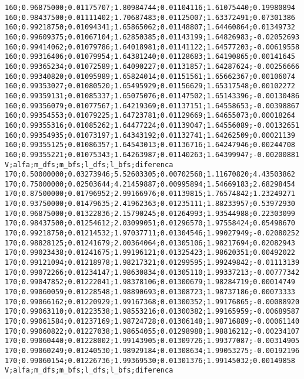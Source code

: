 \documentclass[brazil,times]{abnt}
\begin{document}
{\begin{verbatim}
160;0.96875000;0.01175707;1.80984744;0.01104116;1.61075440;0.19980894
160;0.98437500;0.01111402;1.70687483;0.01125007;1.63372491;0.07301386
160;0.99218750;0.01094341;1.65865062;0.01148807;1.64460864;0.01349732
160;0.99609375;0.01067104;1.62850385;0.01143199;1.64826983;-0.02052693
160;0.99414062;0.01079786;1.64018981;0.01141122;1.64577203;-0.00619558
160;0.99316406;0.01079954;1.64381240;0.01128683;1.64190865;0.00141645
160;0.99365234;0.01072589;1.64090227;0.01131857;1.64287624;-0.00256666
160;0.99340820;0.01095989;1.65824014;0.01151561;1.65662367;0.00106074
160;0.99353027;0.01080520;1.65495929;0.01156629;1.65317548;0.00102272
160;0.99359131;0.01085337;1.65075076;0.01147502;1.65143396;-0.00130486
160;0.99356079;0.01077567;1.64219369;0.01137151;1.64558653;-0.00398867
160;0.99354553;0.01079225;1.64723781;0.01129669;1.64655073;0.00018264
160;0.99355316;0.01085262;1.64477224;0.01139047;1.64556089;-0.00132651
160;0.99354935;0.01073197;1.64343192;0.01132741;1.64262509;0.00021139
160;0.99355125;0.01086357;1.64543013;0.01136716;1.64247946;0.00244708
160;0.99355221;0.01075343;1.64263987;0.01140263;1.64399947;-0.00200881
V;alfa;m_dfs;m_bfs;l_dfs;l_bfs;diferenca
170;0.50000000;0.03273946;5.52603305;0.00702568;1.11670820;4.43503862
170;0.75000000;0.02503644;4.21459887;0.00995894;1.54669183;2.68298454
170;0.87500000;0.01796952;2.99166976;0.01139815;1.76574842;1.23249271
170;0.93750000;0.01479635;2.41962363;0.01235111;1.88233957;0.53972930
170;0.96875000;0.01322836;2.15790245;0.01264993;1.93544988;0.22303099
170;0.98437500;0.01254612;2.03099051;0.01296570;1.97558424;0.05498670
170;0.99218750;0.01214532;1.97037711;0.01304546;1.99027949;-0.02080252
170;0.98828125;0.01241679;2.00364064;0.01305106;1.98217694;0.02082943
170;0.99023438;0.01241675;1.99196121;0.01325423;1.98620351;0.00492022
170;0.99121094;0.01218978;1.98217321;0.01299595;1.99249842;-0.01113139
170;0.99072266;0.01234147;1.98630834;0.01305110;1.99337213;-0.00777342
170;0.99047852;0.01222041;1.98378106;0.01300679;1.98284719;0.00014749
170;0.99060059;0.01228548;1.98890693;0.01308723;1.98737186;0.00073333
170;0.99066162;0.01220929;1.99167368;0.01300352;1.99176865;-0.00088920
170;0.99063110;0.01223538;1.98553216;0.01300382;1.99165959;-0.00689587
170;0.99061584;0.01237169;1.98724728;0.01306148;1.98716889;-0.00061140
170;0.99060822;0.01227038;1.98654055;0.01298988;1.98816212;-0.00234107
170;0.99060440;0.01228002;1.99143905;0.01309726;1.99377087;-0.00314905
170;0.99060249;0.01240530;1.98929184;0.01308634;1.99053275;-0.00192196
170;0.99060154;0.01226736;1.99369530;0.01301376;1.99145032;0.00149858
V;alfa;m_dfs;m_bfs;l_dfs;l_bfs;diferenca

\end{verbatim}}
\end{document}
